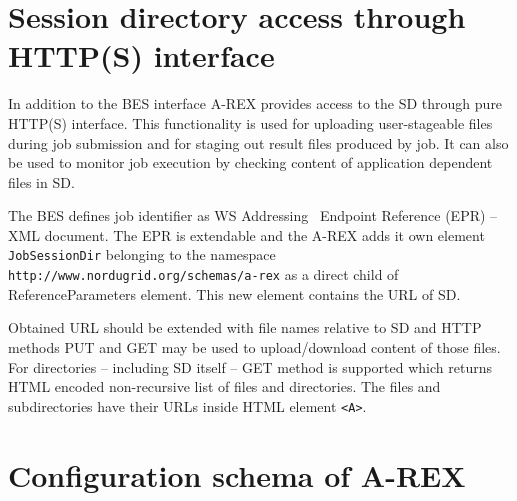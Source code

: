 \documentclass{article}                            %
\begin{document}
\appendix

\section{Session directory access through HTTP(S) interface\label{annex:a}}

In addition to the BES interface A-REX provides access to the SD through
pure HTTP(S) interface. This functionality is used for uploading user-stageable
files during job submission and for staging out result files produced
by job. It can also be used to monitor job execution by checking content
of application dependent files in SD.

The BES defines job identifier as WS Addressing~\cite{ws-addr-soap}
Endpoint Reference (EPR) -- XML document. The EPR is extendable and 
the A-REX adds it own element \texttt{JobSessionDir} belonging to the namespace
\texttt{http://www.nordugrid.org/schemas/a-rex} as a direct child of ReferenceParameters
element. This new element contains the URL of SD.

Obtained URL should be extended with file names relative to SD and
HTTP methods PUT and GET may be used to upload/download content of
those files. For directories -- including SD itself -- GET method is
supported which returns HTML encoded non-recursive list of files and
directories. The files and subdirectories have their URLs inside HTML
element \verb|<A>|.


\section{Configuration schema of A-REX\label{annex:arex-conf}}
\end{document}
